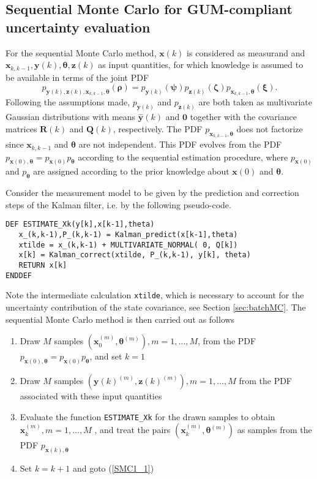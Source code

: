 \documentclass[10pt]{article}
\begin{document}
\begin{spacing}{1}
\subsection{Sequential Monte Carlo for GUM-compliant uncertainty evaluation}
For the sequential Monte Carlo method, $\bm{x}(k)$ is considered as measurand and $\bm{x}_{k,k-1}, \bm{y}(k), \bm{\theta}, \bm{z}(k)$ as input quantities, for which knowledge is assumed to be available in terms of the joint PDF 
\begin{equation}
	p_{\bm{y}(k),\bm{z}(k),\bm{x}_{k,k-1},\bm{\theta}}(\bm{\rho}) = p_{\bm{y}(k)}(\bm{\psi})
	p_{\bm{z}(k)}(\bm{\zeta})
	p_{\bm{x}_{k,k-1}, \bm{\theta}}(\bm{\xi}) .
\end{equation}
Following the assumptions made, $p_{\bm{y}(k)}$ and $p_{\bm{z}(k)}$ are both taken as multivariate Gaussian distributions with means $\hat{\bm{y}}(k)$ and $\bm{0}$ together with the covariance matrices $\bm{R}(k)$ and $\bm{Q}(k)$, respectively.
The PDF $p_{\bm{x}_{k,k-1}, \bm{\theta}}$ does not factorize since $\bm{x}_{k,k-1}$ and $\bm{\theta}$
are not independent. This PDF evolves from the PDF $p_{\bm{x}(0), \bm{\theta}}=p_{\bm{x}(0)} p_{\bm{\theta}}$ according to the sequential estimation procedure, where $p_{\bm{x}(0)}$ and $p_{\bm{\theta}}$ are assigned according to the prior knowledge about $\bm{x}(0)$ and $\bm{\theta}$.

Consider the measurement model to be given by the prediction and correction steps of the Kalman filter, i.e. by the following pseudo-code.
\begin{verbatim}
DEF ESTIMATE_Xk(y[k],x[k-1],theta)
   x_(k,k-1),P_(k,k-1) = Kalman_predict(x[k-1],theta)
   xtilde = x_(k,k-1) + MULTIVARIATE_NORMAL( 0, Q[k])
   x[k] = Kalman_correct(xtilde, P_(k,k-1), y[k], theta)
   RETURN x[k]
ENDDEF
\end{verbatim}
Note the intermediate calculation \verb!xtilde!, which is necessary to account for the uncertainty contribution of the state covariance, see Section \ref{sec:batchMC}. 
The sequential Monte Carlo method is then carried out as follows
\begin{enumerate}
  \item Draw $M$ samples $(\bm{x}_0^{(m)},\bm{\theta}^{(m)}), m=1, \ldots , M$, 
	from the PDF $p_{\bm{x}(0), \bm{\theta}}=p_{\bm{x}(0)} p_{\bm{\theta}}$, and set $k=1$
	\label{SMC1}
	\item Draw $M$ samples $(\bm{y}(k)^{(m)}, \bm{z}(k)^{(m)}), m=1, \ldots, M$ from the PDF associated with these input quantities \label{SMC1_1}
\item Evaluate the function \verb!ESTIMATE_Xk! for the drawn samples to obtain $\bm{x}_{k}^{(m)}, m=1, \ldots, M$ \label{SMC2}, and treat the pairs $(\bm{x}^{(m)}_{k},\bm{\theta}^{(m)})$ as samples from
	the PDF $p_{\bm{x}(k), \bm{\theta}}$
	\item Set $k=k+1$ and goto (\ref{SMC1_1})
 \end{enumerate}
  


\end{spacing}
\end{document}
